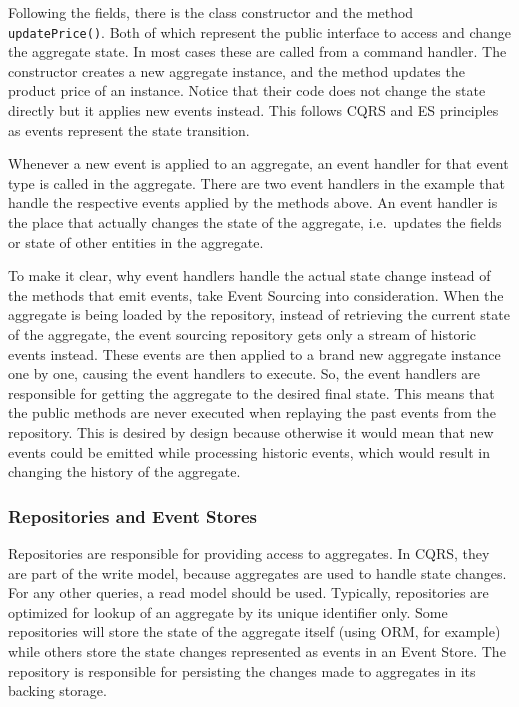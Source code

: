 \documentclass{book}
\begin{document}
Following the fields, there is the class constructor and the method
\texttt{updatePrice()}. Both of which represent the public interface to
access and change the aggregate state. In most cases these are called
from a command handler. The constructor creates a new aggregate
instance, and the method updates the product price of an instance.
Notice that their code does not change the state directly but it applies
new events instead. This follows CQRS and ES principles as events
represent the state transition.

Whenever a new event is applied to an aggregate, an event handler for
that event type is called in the aggregate. There are two event handlers
in the example that handle the respective events applied by the methods
above. An event handler is the place that actually changes the state of
the aggregate, i.e.~updates the fields or state of other entities in the
aggregate.

To make it clear, why event handlers handle the actual state change
instead of the methods that emit events, take Event Sourcing into
consideration. When the aggregate is being loaded by the repository,
instead of retrieving the current state of the aggregate, the event
sourcing repository gets only a stream of historic events instead. These
events are then applied to a brand new aggregate instance one by one,
causing the event handlers to execute. So, the event handlers are
responsible for getting the aggregate to the desired final state. This
means that the public methods are never executed when replaying the past
events from the repository. This is desired by design because otherwise
it would mean that new events could be emitted while processing historic
events, which would result in changing the history of the aggregate.


\subsubsection{Repositories and Event
Stores}\label{repositories-and-event-stores}

Repositories are responsible for providing access to aggregates. In
CQRS, they are part of the write model, because aggregates are used to
handle state changes. For any other queries, a read model should be
used. Typically, repositories are optimized for lookup of an aggregate
by its unique identifier only. Some repositories will store the state of
the aggregate itself (using ORM, for example) while others store the
state changes represented as events in an Event Store. The repository is
responsible for persisting the changes made to aggregates in its backing
storage.
\end{document}
